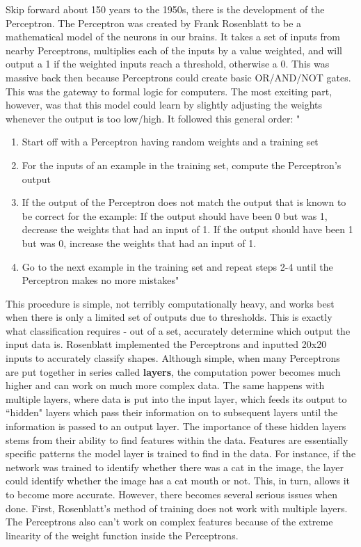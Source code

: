 \documentclass[12pt]{article}
\begin{document}
Skip forward about 150 years to the 1950s, there is the development of the Perceptron. The Perceptron was created by Frank Rosenblatt to be a mathematical model of the neurons in our brains. It takes a set of inputs from nearby Perceptrons, multiplies each of the inputs by a value weighted, and will output a 1 if the weighted inputs reach a threshold, otherwise a 0. This was massive back then because Perceptrons could create basic OR/AND/NOT gates. This was the gateway to formal logic for computers. The most exciting part, however, was that this model could learn by slightly adjusting the weights whenever the output is too low/high. It followed this general order: " 
\begin{enumerate}
\item Start off with a Perceptron having random weights and a training set
\item For the inputs of an example in the training set, compute the Perceptron’s output
\item If the output of the Perceptron does not match the output that is known to be correct for the example: If the output should have been 0 but was 1, decrease the weights that had an input of 1. If the output should have been 1 but was 0, increase the weights that had an input of 1.
\item Go to the next example in the training set and repeat steps 2-4 until the Perceptron makes no more mistakes"
\end{enumerate} \cite{kurenkov}

This procedure is simple, not terribly computationally heavy, and works best when there is only a limited set of outputs due to thresholds. This is exactly what classification requires - out of a set, accurately determine which output the input data is. Rosenblatt implemented the Perceptrons and inputted 20x20 inputs to accurately classify shapes. Although simple, when many Perceptrons are put together in series called \textbf{layers}, the computation power becomes much higher and can work on much more complex data. The same happens with multiple layers, where data is put into the input layer, which feeds its output to ``hidden" layers which pass their information on to subsequent layers until the information is passed to an output layer. The importance of these hidden layers stems from their ability to find features within the data. Features are essentially specific patterns the model layer is trained to find in the data. For instance, if the network was trained to identify whether there was a cat in the image, the layer could identify whether the image has a cat mouth or not. This, in turn, allows it to become more accurate. However, there becomes several serious issues when done. First, Rosenblatt's method of training does not work with multiple layers. The Perceptrons also can't work on complex features because of the extreme linearity of the weight function inside the Perceptrons. 
\end{document}
